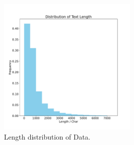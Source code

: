 \documentclass{article}
\begin{document}


\begin{figure}[htbp]
  \centering
  \includegraphics[width=0.6\textwidth]{picture/Length_analyze_bar.pdf}
  \caption{Length distribution of Data.}
  \label{fig4length}
\end{figure}
\end{document}
